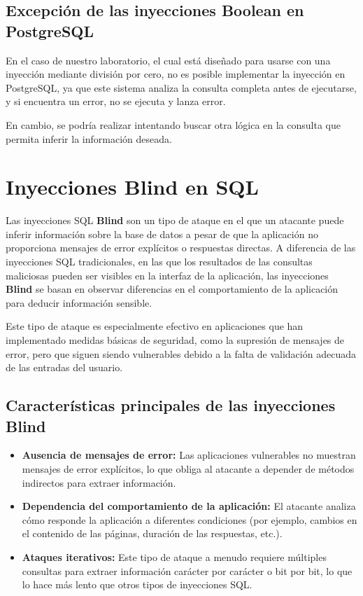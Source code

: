 \documentclass[a4paper,12pt]{article}
\begin{document}
\subsection{Excepción de las inyecciones Boolean en PostgreSQL}

En el caso de nuestro laboratorio, el cual está diseñado para usarse con una inyección mediante división por cero, no es posible implementar la inyección en PostgreSQL, ya que este sistema analiza la consulta completa antes de ejecutarse, y si encuentra un error, no se ejecuta y lanza error.

En cambio, se podría realizar intentando buscar otra lógica en la consulta que permita inferir la información deseada.
\section{Inyecciones Blind en SQL}
Las inyecciones SQL \textbf{Blind} son un tipo de ataque en el que un atacante puede inferir información sobre la base de datos a pesar de que la aplicación no proporciona mensajes de error explícitos o respuestas directas. A diferencia de las inyecciones SQL tradicionales, en las que los resultados de las consultas maliciosas pueden ser visibles en la interfaz de la aplicación, las inyecciones \textbf{Blind} se basan en observar diferencias en el comportamiento de la aplicación para deducir información sensible.

Este tipo de ataque es especialmente efectivo en aplicaciones que han implementado medidas básicas de seguridad, como la supresión de mensajes de error, pero que siguen siendo vulnerables debido a la falta de validación adecuada de las entradas del usuario.

\subsection{Características principales de las inyecciones Blind}

\begin{itemize}
    \item \textbf{Ausencia de mensajes de error:} 
    Las aplicaciones vulnerables no muestran mensajes de error explícitos, lo que obliga al atacante a depender de métodos indirectos para extraer información.

    \item \textbf{Dependencia del comportamiento de la aplicación:} 
    El atacante analiza cómo responde la aplicación a diferentes condiciones (por ejemplo, cambios en el contenido de las páginas, duración de las respuestas, etc.).

    \item \textbf{Ataques iterativos:} 
    Este tipo de ataque a menudo requiere múltiples consultas para extraer información carácter por carácter o bit por bit, lo que lo hace más lento que otros tipos de inyecciones SQL.
\end{itemize}
\end{document}
